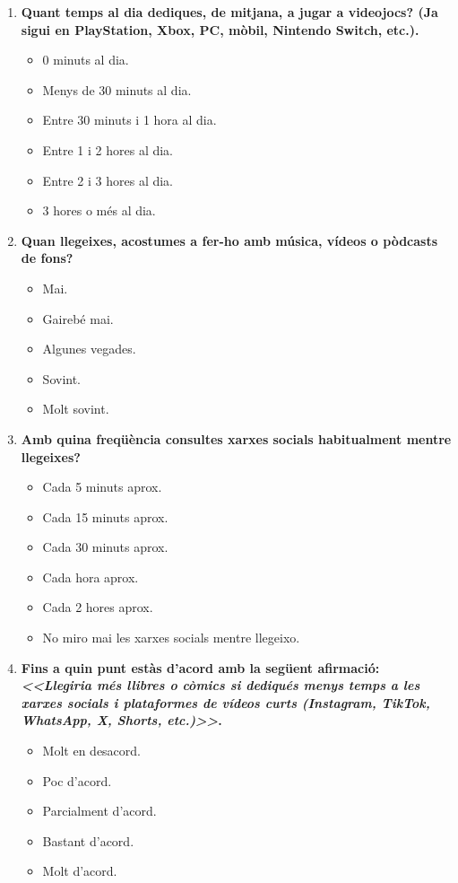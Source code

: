 \documentclass[12pt]{article}
\begin{document}
\begin{enumerate}
    \item \textbf{Quant temps al dia dediques, de mitjana, a jugar a videojocs? (Ja sigui en PlayStation, Xbox, PC, mòbil, Nintendo Switch, etc.).}
    \begin{itemize}
        \item[$\square$] 0 minuts al dia.
        \item[$\square$] Menys de 30 minuts al dia.
        \item[$\square$] Entre 30 minuts i 1 hora al dia.
        \item[$\square$] Entre 1 i 2 hores al dia.
        \item[$\square$] Entre 2 i 3 hores al dia.
        \item[$\square$] 3 hores o més al dia.
    \end{itemize}

    \item \textbf{Quan llegeixes, acostumes a fer-ho amb música, vídeos o pòdcasts de fons?}
    \begin{itemize}
        \item[$\square$] Mai.
        \item[$\square$] Gairebé mai.
        \item[$\square$] Algunes vegades.
        \item[$\square$] Sovint.
        \item[$\square$] Molt sovint.
    \end{itemize}

    \item \textbf{Amb quina freqüència consultes xarxes socials habitualment mentre llegeixes?}
    \begin{itemize}
        \item[$\square$] Cada 5 minuts aprox.
        \item[$\square$] Cada 15 minuts aprox.
        \item[$\square$] Cada 30 minuts aprox.
        \item[$\square$] Cada hora aprox.
        \item[$\square$] Cada 2 hores aprox.
        \item[$\square$] No miro mai les xarxes socials mentre llegeixo.
    \end{itemize}

    \item \textbf{Fins a quin punt estàs d'acord amb la següent afirmació: \textit{<<Llegiria més llibres o còmics si dediqués menys temps a les xarxes socials i plataformes de vídeos curts (Instagram, TikTok, WhatsApp, X, Shorts, etc.)>>}.}
    \begin{itemize}
        \item[$\square$] Molt en desacord.
        \item[$\square$] Poc d'acord.
        \item[$\square$] Parcialment d'acord.
        \item[$\square$] Bastant d'acord.
        \item[$\square$] Molt d'acord.
    \end{itemize}


\end{enumerate}
\end{document}
